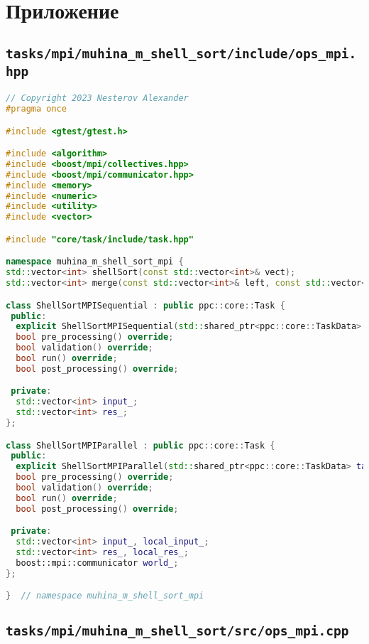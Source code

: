 \documentclass[12pt]{article}
\begin{document}
\appendix
\section*{Приложение}
\subsection*{\texttt{tasks/mpi/muhina\_m\_shell\_sort/include/ops\_mpi.hpp}}

\begin{lstlisting}[language=C++]
// Copyright 2023 Nesterov Alexander
#pragma once

#include <gtest/gtest.h>

#include <algorithm>
#include <boost/mpi/collectives.hpp>
#include <boost/mpi/communicator.hpp>
#include <memory>
#include <numeric>
#include <utility>
#include <vector>

#include "core/task/include/task.hpp"

namespace muhina_m_shell_sort_mpi {
std::vector<int> shellSort(const std::vector<int>& vect);
std::vector<int> merge(const std::vector<int>& left, const std::vector<int>& right);

class ShellSortMPISequential : public ppc::core::Task {
 public:
  explicit ShellSortMPISequential(std::shared_ptr<ppc::core::TaskData> taskData_) : Task(std::move(taskData_)) {}
  bool pre_processing() override;
  bool validation() override;
  bool run() override;
  bool post_processing() override;

 private:
  std::vector<int> input_;
  std::vector<int> res_;
};

class ShellSortMPIParallel : public ppc::core::Task {
 public:
  explicit ShellSortMPIParallel(std::shared_ptr<ppc::core::TaskData> taskData_) : Task(std::move(taskData_)) {}
  bool pre_processing() override;
  bool validation() override;
  bool run() override;
  bool post_processing() override;

 private:
  std::vector<int> input_, local_input_;
  std::vector<int> res_, local_res_;
  boost::mpi::communicator world_;
};

}  // namespace muhina_m_shell_sort_mpi

\end{lstlisting}

\subsection*{\texttt{tasks/mpi/muhina\_m\_shell\_sort/src/ops\_mpi.cpp}}
\end{document}
